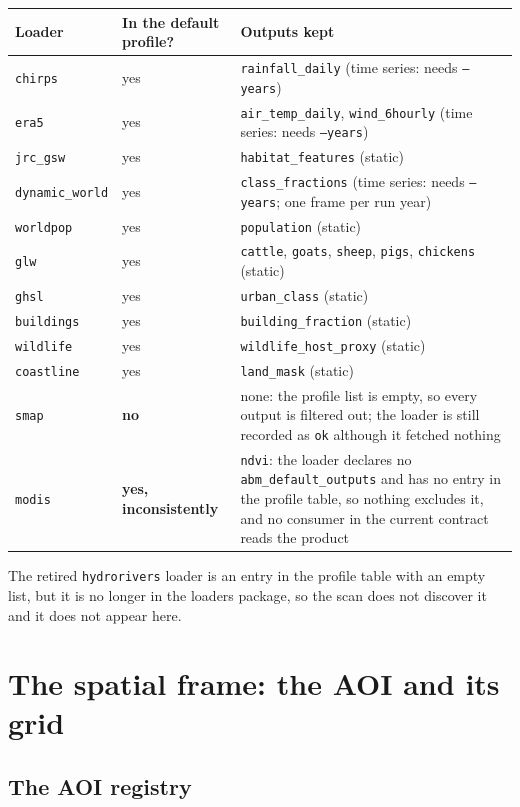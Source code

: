 \documentclass[11pt,a4paper]{article}
\newcommand{\code}[1]{\texttt{#1}}
\begin{document}
\begin{longtable}{@{}llp{}@{}}
\toprule
Loader & In the default profile? & Outputs kept \\
\midrule
\endhead
\code{chirps} & yes & \code{rainfall\_daily} (time series: needs \code{--years}) \\
\code{era5} & yes & \code{air\_temp\_daily}, \code{wind\_6hourly} (time series: needs \code{--years}) \\
\code{jrc\_gsw} & yes & \code{habitat\_features} (static) \\
\code{dynamic\_world} & yes & \code{class\_fractions} (time series: needs \code{--years}; one frame per run year) \\
\code{worldpop} & yes & \code{population} (static) \\
\code{glw} & yes & \code{cattle}, \code{goats}, \code{sheep}, \code{pigs}, \code{chickens} (static) \\
\code{ghsl} & yes & \code{urban\_class} (static) \\
\code{buildings} & yes & \code{building\_fraction} (static) \\
\code{wildlife} & yes & \code{wildlife\_host\_proxy} (static) \\
\code{coastline} & yes & \code{land\_mask} (static) \\
\code{smap} & \textbf{no} & none: the profile list is empty, so every output is filtered out; the loader is still recorded as \code{ok} although it fetched nothing \\
\code{modis} & \textbf{yes, inconsistently} & \code{ndvi}: the loader declares no \code{abm\_default\_outputs} and has no entry in the profile table, so nothing excludes it, and no consumer in the current contract reads the product \\
\midrule
\end{longtable}

The retired \code{hydrorivers} loader is an entry in the profile table with
an empty list, but it is no longer in the loaders package, so the scan does
not discover it and it does not appear here.

\section{The spatial frame: the AOI and its grid}

\subsection{The AOI registry}
\label{sec:aoi-registry}
\end{document}
